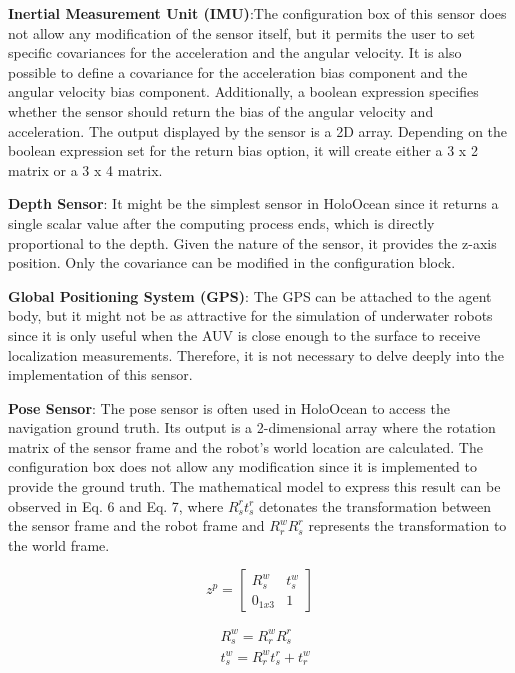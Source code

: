 \documentclass[]{article}
\begin{document}
	\textbf{Inertial Measurement Unit (IMU)}:The configuration box of this sensor does not allow any modification of the sensor itself, but it permits the user to set specific covariances for the acceleration and the angular velocity. It is also possible to define a covariance for the acceleration bias component and the angular velocity bias component. Additionally, a boolean expression specifies whether the sensor should return the bias of the angular velocity and acceleration. The output displayed by the sensor is a 2D array. Depending on the boolean expression set for the return bias option, it will create either a 3 x 2 matrix or a 3 x 4 matrix.
	
	\textbf{Depth Sensor}: It might be the simplest sensor in HoloOcean since it returns a single scalar value after the computing process ends, which is directly proportional to the depth. Given the nature of the sensor, it provides the z-axis position. Only the covariance can be modified in the configuration block.
	
	\textbf{Global Positioning System (GPS)}: The GPS can be attached to the agent body, but it might not be as attractive for the simulation of underwater robots since it is only useful when the AUV is close enough to the surface to receive localization measurements. Therefore, it is not necessary to delve deeply into the implementation of this sensor.
	
	\textbf{Pose Sensor}: The pose sensor is often used in HoloOcean to access the navigation ground truth. Its output is a 2-dimensional array where the rotation matrix of the sensor frame and the robot's world location are calculated. The configuration box does not allow any modification since it is implemented to provide the ground truth. The mathematical model to express this result can be observed in Eq. 6 and Eq. 7, where $R^{r}_{s}t^{r}_{s}$ detonates the transformation between the sensor frame and the robot frame and $R^{w}_{r}R^{r}_{s}$ represents the transformation to the world frame.
	
	\begin{equation}
		z^p = \begin{bmatrix}
			R^{w}_s & t^{w}_s \\
			0 _{1x3} & 1
		\end{bmatrix}
	\end{equation}
	
	\begin{equation}
		\begin{aligned}
		& R^{w}_s = R^{w}_{r}R^{r}_{s} \\
		& t^{w}_s = R^{w}_{r}t^{r}_s + t^{w}_r
		\end{aligned}
	\end{equation}
	
\end{document}
